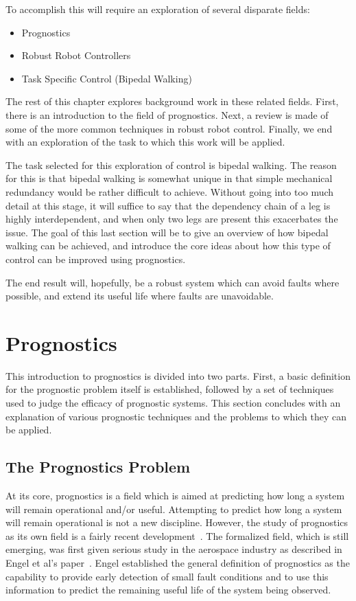 \documentclass[12pt]{article}
\begin{document}
To accomplish this will require an exploration of several disparate
fields:
\begin{itemize}
\item Prognostics
\item Robust Robot Controllers
\item Task Specific Control (Bipedal Walking)
\end{itemize}
The rest of this chapter explores background work in these related
fields.  First, there is an introduction to the field of prognostics.
Next, a review is made of some of the more common techniques in robust
robot control.  Finally, we end with an exploration of the task to
which this work will be applied.

The task selected for this exploration of control is bipedal walking.
The reason for this is that bipedal walking is somewhat unique in that
simple mechanical redundancy would be rather difficult to achieve.
Without going into too much detail at this stage, it will suffice to
say that the dependency chain of a leg is highly interdependent, and
when only two legs are present this exacerbates the issue.  The goal
of this last section will be to give an overview of how bipedal
walking can be achieved, and introduce the core ideas about how this
type of control can be improved using prognostics.

The end result will, hopefully, be a robust system which can avoid
faults where possible, and extend its useful life where faults are
unavoidable.

\section{Prognostics}
This introduction to prognostics is divided into two parts.  First, a
basic definition for the prognostic problem itself is established,
followed by a set of techniques used to judge the efficacy of
prognostic systems.  This section concludes with an explanation of
various prognostic techniques and the problems to which they can be
applied.


\subsection{The Prognostics Problem}
At its core, prognostics is a field which is aimed at predicting how
long a system will remain operational and/or useful.  Attempting to
predict how long a system will remain operational is not a new
discipline.  However, the study of prognostics as its own field is a
fairly recent development~\cite{877920}.  The formalized field, which
is still emerging, was first given serious study in the aerospace
industry as described in Engel et al's paper~\cite{877920}.  Engel
established the general definition of prognostics as the capability to
provide early detection of small fault conditions and to use this
information to predict the remaining useful life of the system being
observed.
\end{document}
